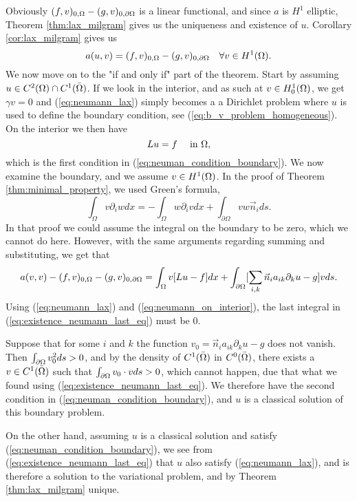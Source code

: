\begin{bev}
   Obviously $ (f,v)_{0,\Omega} - (g,v)_{0,\partial\Omega}$ is a linear functional, 
   and since $a$ is $H^1$ elliptic, Theorem \ref{thm:lax_milgram} gives us the 
   uniqueness and existence of $u$.
   Corollary \ref{cor:lax_milgram} gives us
   \begin{equation}
      a(u,v) = (f,v)_{0,\Omega} - (g,v)_{0,\partial\Omega} \quad \forall v \in H^1(\Omega). \label{eq:neumann_lax}
   \end{equation}
   We now move on to the "if and only if" part of the theorem. Start by 
   assuming $u \in C^2(\Omega)\cap C^1(\bar{\Omega})$.
   If we look in the interior, and as such at $v \in H^1_0(\Omega)$, we get $\gamma v=0$ 
   and (\ref{eq:neumann_lax}) simply becomes a a Dirichlet problem where 
   $u$ is used to define the boundary condition, see (\ref{eq:b_v_problem_homogeneous}).
   On the interior we then have 
   \begin{equation}
    Lu = f \quad \text{ in }\Omega, \label{eq:neumann_on_interior}
   \end{equation} 
   which is the first condition in (\ref{eq:neuman_condition_boundary}).
   We now examine the boundary, and we assume $v\in H^1(\Omega)$.
   In the proof of Theorem \ref{thm:minimal_property}, we used Green's formula,
    \begin{equation} %
        \int_\Omega v\partial_i w dx = -\int_\Omega w \partial_i v dx + \int_{\partial \Omega} v w \vec{n}_i ds.
    \end{equation}
   In that proof we could assume the integral on the boundary to be zero, which 
   we cannot do here. However, with the same arguments regarding summing and substituting, 
   we get that 
   \begin{equation}
      a(v,v) - (f,v)_{0,\Omega} - (g,v)_{0,\partial\Omega} = 
      \int_\Omega v[Lu - f] dx + \int_{\partial \Omega}
     [ \sum_{i,k}  \vec{n}_i a_{ik} \partial_k u-g]v ds.
     \label{eq:existence_neumann_last_eq}
   \end{equation}
   Using (\ref{eq:neumann_lax}) and (\ref{eq:neumann_on_interior}),
   the last integral in (\ref{eq:existence_neumann_last_eq}) must be $0$.

   Suppose that for some $i$ and $k$ the function $v_0 = \vec{n}_i a_{ik} \partial_k u -g$ does 
   not vanish. Then $\int_{\partial\Omega}v_0^2ds>0$, and by the density of 
   $C^1(\bar{\Omega})$ in $C^0(\bar{\Omega})$, there exists a $v\in C^1(\bar{\Omega})$
   such that  $\int_{\partial\Omega}v_0\cdot vds>0$, which cannot happen, due that 
   what we found using (\ref{eq:existence_neumann_last_eq}). 
   We therefore have the second condition in (\ref{eq:neuman_condition_boundary}),
   and $u$ is a classical solution of this boundary problem.

   On the other hand, assuming $u$ is a classical solution and satisfy (\ref{eq:neuman_condition_boundary}),
   we see from (\ref{eq:existence_neumann_last_eq}) that $u$ also satisfy 
   (\ref{eq:neumann_lax}), and is therefore a solution to the variational 
   problem, and by Theorem \ref{thm:lax_milgram} unique.
\end{bev}